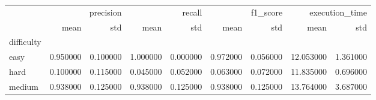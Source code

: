 \begin{tabular}{lrrrrrrrr}
\toprule
 & \multicolumn{2}{r}{precision} & \multicolumn{2}{r}{recall} & \multicolumn{2}{r}{f1_score} & \multicolumn{2}{r}{execution_time} \\
 & mean & std & mean & std & mean & std & mean & std \\
difficulty &  &  &  &  &  &  &  &  \\
\midrule
easy & 0.950000 & 0.100000 & 1.000000 & 0.000000 & 0.972000 & 0.056000 & 12.053000 & 1.361000 \\
hard & 0.100000 & 0.115000 & 0.045000 & 0.052000 & 0.063000 & 0.072000 & 11.835000 & 0.696000 \\
medium & 0.938000 & 0.125000 & 0.938000 & 0.125000 & 0.938000 & 0.125000 & 13.764000 & 3.687000 \\
\bottomrule
\end{tabular}
